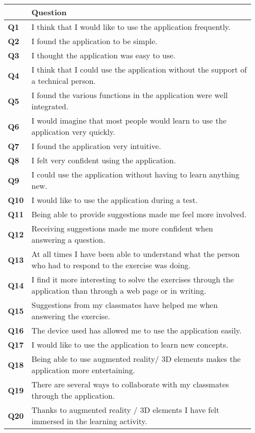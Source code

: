 \begin{longtable}{p{}>{\arraybackslash}p{}}
\toprule
 & Question\\
\midrule
    \textbf{Q1} & I think that I would like to use the application frequently. \\
    \textbf{Q2} & I found the application to be simple. \\
    \textbf{Q3} &I thought the application was easy to use. \\
    \textbf{Q4} & I think that I could use the application without the support of a technical person. \\
    \textbf{Q5} & I found the various functions in the application were well integrated. \\
    \textbf{Q6} & I would imagine that most people would learn to use the application very quickly. \\
    \textbf{Q7} & I found the application very intuitive. \\
    \textbf{Q8} & I felt very confident using the application. \\
    \textbf{Q9} & I could use the application without having to learn anything new. \\
    \textbf{Q10} & I would like to use the application during a test. \\
    \textbf{Q11} & Being able to provide suggestions made me feel more involved. \\
    \textbf{Q12} & Receiving suggestions made me more confident when answering a question. \\
    \textbf{Q13} & At all times I have been able to understand what the person who had to respond to the exercise was doing. \\
    \textbf{Q14} & I find it more interesting to solve the exercises through the application than through a web page or in writing. \\
    \textbf{Q15} & Suggestions from my classmates have helped me when answering the exercise. \\
    \textbf{Q16} & The device used  has allowed me to use the application easily. \\
    \textbf{Q17} & I would like to use the application to learn new concepts. \\
    \textbf{Q18} & Being able to use augmented reality/ 3D elements makes the application more entertaining. \\
    \textbf{Q19} & There are several ways to collaborate with my classmates through the application. \\
    \textbf{Q20} & Thanks to augmented reality / 3D elements I have felt immersed in the learning activity. \\
\bottomrule
\end{longtable}
\label{tab:studentquestionnaire}

